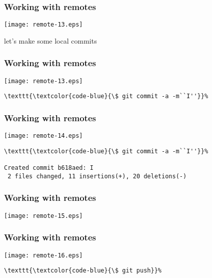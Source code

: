\documentclass[english]{beamer}
\newcommand{\CMD}[1]{%
\texttt{\textcolor{code-blue}{#1}}%
}
\begin{document}
\begin{frame}[fragile]
\frametitle{Working with remotes}

\texttt{[image: remote-13.eps]}

\begin{center}
        let's make some local commits
\end{center}
\vspace{\textheight}
\end{frame}

\begin{frame}[fragile]
\frametitle{Working with remotes}

\texttt{[image: remote-13.eps]}

\begin{Verbatim}[commandchars=\\\{\}]
\CMD{\$ git commit -a -m``I''}
\end{Verbatim}
\vspace{\textheight}
\end{frame}

\begin{frame}[fragile]
\frametitle{Working with remotes}

\texttt{[image: remote-14.eps]}

{\tiny
\begin{Verbatim}[commandchars=\\\{\}]
\CMD{\$ git commit -a -m``I''}
Created commit b618aed: I
 2 files changed, 11 insertions(+), 20 deletions(-)
\end{Verbatim}
}
\vspace{\textheight}
\end{frame}

\begin{frame}[fragile]
\frametitle{Working with remotes}

\texttt{[image: remote-15.eps]}

\vspace{\textheight}
\end{frame}

\begin{frame}[fragile]
\frametitle{Working with remotes}

\texttt{[image: remote-16.eps]}

\begin{Verbatim}[commandchars=\\\{\}]
\CMD{\$ git push}
\end{Verbatim}
\vspace{\textheight}
\end{frame}
\end{document}
